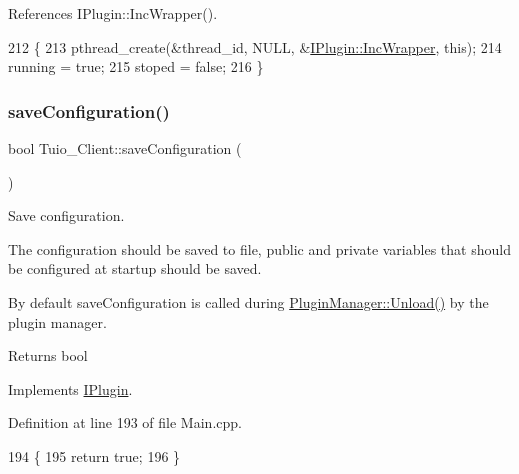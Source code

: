 References I\+Plugin\+::\+Inc\+Wrapper().


\begin{DoxyCode}
212 \{
213     pthread\_create(&thread\_id, NULL, &\hyperlink{class_i_plugin_a62d22be2fdf66eb7f5c2f797f5f3d7f3}{IPlugin::IncWrapper}, \textcolor{keyword}{this});
214     running = \textcolor{keyword}{true};
215     stoped = \textcolor{keyword}{false};
216 \}
\end{DoxyCode}
\mbox{\label{class_tuio___client_a56700c6b7cf9447fde0e3828e90cd55f}} 
\subsubsection{\texorpdfstring{save\+Configuration()}{saveConfiguration()}}
{\footnotesize\ttfamily bool Tuio\+\_\+\+Client\+::save\+Configuration (\begin{DoxyParamCaption}{ }\end{DoxyParamCaption})\hspace{0.3cm}{\ttfamily [virtual]}}



Save configuration. 

The configuration should be saved to file, public and private variables that should be configured at startup should be saved.

By default save\+Configuration is called during \hyperlink{class_plugin_manager_ab651a05d6fcb92562807e9f5ecc30855}{Plugin\+Manager\+::\+Unload()} by the plugin manager.

\begin{DoxyReturn}{Returns}
bool 
\end{DoxyReturn}


Implements \hyperlink{class_i_plugin_a79b5c42b1c7b08257a6110b2091039bc}{I\+Plugin}.



Definition at line 193 of file Main.\+cpp.


\begin{DoxyCode}
194 \{
195     \textcolor{keywordflow}{return} \textcolor{keyword}{true};
196 \}
\end{DoxyCode}
\mbox{\label{class_tuio___client_a2df126802294be8dc168c409af801779}} 
